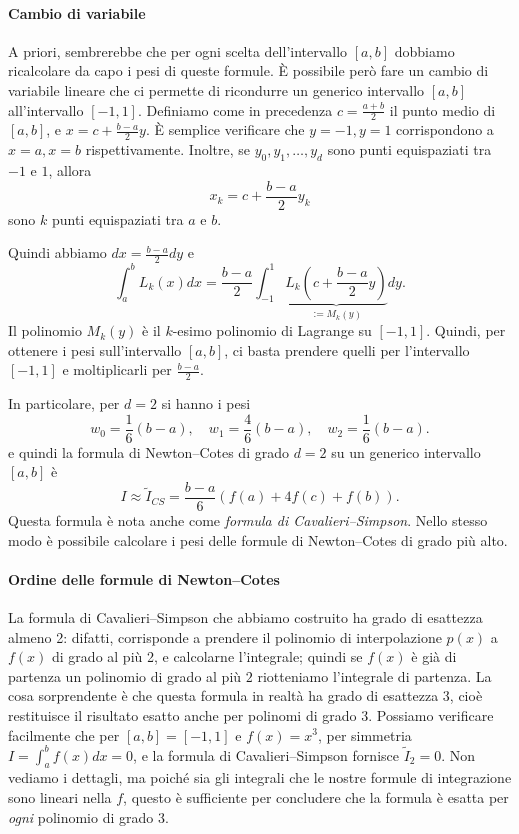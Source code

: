 \documentclass[a4paper]{report}
\theoremstyle{definition}
\theoremstyle{remark}
\newcommand{\checkkey}[1]{%
        \ifstrequal{#1}{inf}{\setbool{showcontent}{true}}{}%
    }
\newenvironment{conditional}[1][]{%
        \setbool{showcontent}{false}%
        \forcsvlist\checkkey{#1}%
        \ifbool{showcontent}{\begingroup}{\expandafter\comment}%
    }{%
        \ifbool{showcontent}{\endgroup}{\expandafter\endcomment}%
    }
\newcommand{\checkkey}[1]{%
        \ifstrequal{#1}{ich}{\setbool{showcontent}{true}}{}%
    }
\newenvironment{conditional}[1][]{%
        \setbool{showcontent}{false}%
        \forcsvlist\checkkey{#1}%
        \ifbool{showcontent}{\begingroup}{\expandafter\comment}%
    }{%
        \ifbool{showcontent}{\endgroup}{\expandafter\endcomment}%
    }
\begin{document}
\begin{conditional}[ich]
\paragraph{Cambio di variabile} A priori, sembrerebbe che per ogni scelta dell'intervallo $[a,b]$ dobbiamo ricalcolare da capo i pesi di queste formule. È possibile però fare un cambio di variabile lineare che ci permette di ricondurre un generico intervallo $[a,b]$ all'intervallo $[-1,1]$. Definiamo come in precedenza $c=\frac{a+b}{2}$ il punto medio di $[a,b]$, e $x = c + \frac{b-a}{2}y$. È semplice verificare che $y=-1,y=1$ corrispondono a $x=a,x=b$ rispettivamente. Inoltre, se $y_0,y_1,\dots,y_d$ sono punti equispaziati tra $-1$ e $1$, allora
\[
    x_k = c + \frac{b-a}{2}y_k
\]
sono $k$ punti equispaziati tra $a$ e $b$.

Quindi abbiamo $dx = \frac{b-a}{2}dy$ e 
\[
\int_{a}^b L_k(x)dx = \frac{b-a}{2}\int_{-1}^1 \underbrace{L_k\left(c+\frac{b-a}{2}y\right)}_{:=M_k(y)} dy.
\]
Il polinomio $M_k(y)$ è il $k$-esimo polinomio di Lagrange su $[-1,1]$. Quindi, per ottenere i pesi sull'intervallo $[a,b]$, ci basta prendere quelli per l'intervallo $[-1,1]$ e moltiplicarli per $\frac{b-a}{2}$.

In particolare, per $d=2$ si hanno i pesi
\[
w_0 = \frac16(b-a), \quad w_1 = \frac46 (b-a), \quad w_2 = \frac16 (b-a).
\]
e quindi la formula di Newton--Cotes di grado $d=2$ su un generico intervallo $[a,b]$ è
\[
I \approx \tilde{I}_{CS} = \frac{b-a}{6}\left(f(a) + 4f(c) + f(b)\right).
\]
Questa formula è nota anche come \emph{formula di Cavalieri--Simpson}. Nello stesso modo è possibile calcolare i pesi delle formule di Newton--Cotes di grado più alto.



\paragraph{Ordine delle formule di Newton--Cotes}

La formula di Cavalieri--Simpson che abbiamo costruito ha grado di esattezza almeno 2: difatti, corrisponde a prendere il polinomio di interpolazione $p(x)$ a $f(x)$ di grado al più 2, e calcolarne l'integrale; quindi se $f(x)$ è già di partenza un polinomio di grado al più $2$ riotteniamo l'integrale di partenza. La cosa sorprendente è che questa formula in realtà ha grado di esattezza 3, cioè restituisce il risultato esatto anche per polinomi di grado $3$. Possiamo verificare facilmente che per $[a,b]=[-1,1]$ e $f(x)=x^3$, per simmetria $I = \int_{a}^b f(x) dx = 0$, e la  formula di Cavalieri--Simpson fornisce $\tilde{I}_2=0$. Non vediamo i dettagli, ma poiché sia gli integrali che le nostre formule di integrazione sono lineari nella $f$, questo è sufficiente per concludere che la formula è esatta per \emph{ogni} polinomio di grado 3.


\end{conditional}
\end{document}
